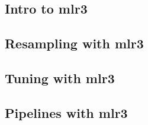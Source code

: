 \subsection{Intro to mlr3}


\subsection{Resampling with mlr3}


\subsection{Tuning with mlr3}


\subsection{Pipelines with mlr3}


